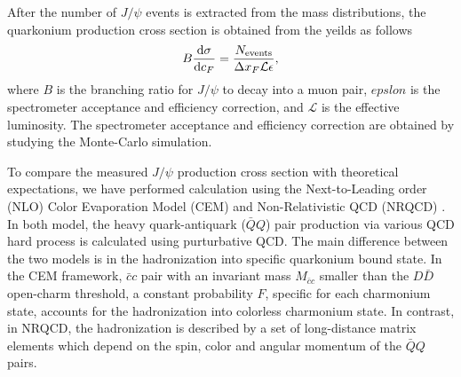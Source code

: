 \documentclass[10pt, a4paper,final]{article}
\begin{document}
After the number of $J/\psi$ events is extracted from the mass distributions,
the quarkonium production cross section is obtained from the yeilds as follows
\begin{equation}
	B\dv{\sigma}{c_F} = \frac{N_{\textrm{events}}}{\Delta x_F \mathcal{L} \epsilon},
\end{equation}
where $B$ is the branching ratio for $J/\psi$ to decay into a muon pair,
$epslon$ is the spectrometer acceptance and efficiency correction, and
$\mathcal{L}$ is the effective luminosity. The spectrometer acceptance and
efficiency correction are obtained by studying the Monte-Carlo simulation.

To compare the measured $J/\psi$ production cross section with theoretical
expectations, we have performed calculation using the Next-to-Leading
order (NLO) Color Evaporation Model (CEM)\cite{mangano1993} and
Non-Relativistic QCD (NRQCD) \cite{bodwin1997}. In both model, the heavy
quark-antiquark ($\bar{Q}Q$) pair production via various QCD hard process
is calculated using purturbative QCD. The main difference between the two
models is in the hadronization into specific quarkonium bound state.
In the CEM framework, $\bar{c}c$ pair with an invariant mass $M_{\bar{c}c}$
smaller than the $D\bar{D}$ open-charm threshold, a constant probability $F$,
specific for each charmonium state, accounts for the hadronization into
colorless charmonium state. In contrast, in NRQCD, the hadronization is
described by a set of long-distance matrix elements which depend on the spin,
color and angular momentum of the $\bar{Q}Q$ pairs.
\end{document}
